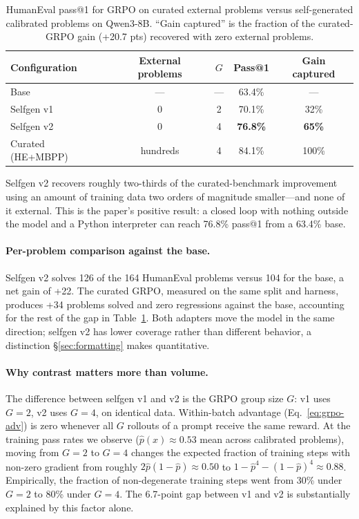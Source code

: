 \documentclass[11pt,a4paper]{article}
\begin{document}
\begin{table}[ht]
\centering
\caption{HumanEval pass@1 for GRPO on curated external problems versus self-generated calibrated problems on Qwen3-8B. ``Gain captured'' is the fraction of the curated-GRPO gain (+20.7 pts) recovered with zero external problems.}
\label{tab:main}
\begin{tabular}{lcccc}
\toprule
Configuration & External problems & $G$ & Pass@1 & Gain captured \\
\midrule
Base & --- & --- & 63.4\% & --- \\
Selfgen v1 & 0 & 2 & 70.1\% & 32\% \\
Selfgen v2 & 0 & 4 & \textbf{76.8\%} & \textbf{65\%} \\
Curated (HE+MBPP) & hundreds & 4 & 84.1\% & 100\% \\
\bottomrule
\end{tabular}
\end{table}

Selfgen v2 recovers roughly two-thirds of the curated-benchmark improvement using an amount of training data two orders of magnitude smaller---and none of it external.
This is the paper's positive result: a closed loop with nothing outside the model and a Python interpreter can reach 76.8\% pass@1 from a 63.4\% base.

\paragraph{Per-problem comparison against the base.}
Selfgen v2 solves 126 of the 164 HumanEval problems versus 104 for the base, a net gain of +22.
The curated GRPO, measured on the same split and harness, produces +34 problems solved and zero regressions against the base, accounting for the rest of the gap in Table~\ref{tab:main}.
Both adapters move the model in the same direction; selfgen v2 has lower coverage rather than different behavior, a distinction \S\ref{sec:formatting} makes quantitative.

\paragraph{Why contrast matters more than volume.}
The difference between selfgen v1 and v2 is the GRPO group size $G$: v1 uses $G = 2$, v2 uses $G = 4$, on identical data.
Within-batch advantage (Eq.~\ref{eq:grpo-adv}) is zero whenever all $G$ rollouts of a prompt receive the same reward.
At the training pass rates we observe ($\hat{p}(x) \approx 0.53$ mean across calibrated problems), moving from $G = 2$ to $G = 4$ changes the expected fraction of training steps with non-zero gradient from roughly $2\hat{p}(1-\hat{p}) \approx 0.50$ to $1 - \hat{p}^4 - (1-\hat{p})^4 \approx 0.88$.
Empirically, the fraction of non-degenerate training steps went from 30\% under $G=2$ to 80\% under $G=4$.
The 6.7-point gap between v1 and v2 is substantially explained by this factor alone.
\end{document}
